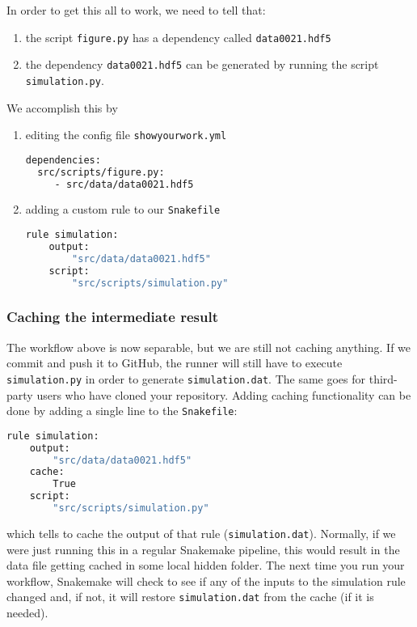 \documentclass{aa}
\begin{document}
In order to get this all to work, we need to tell \showyourwork that:
\begin{enumerate}
\item the script \texttt{figure.py} has a dependency called \texttt{data0021.hdf5}
\item the dependency \texttt{data0021.hdf5} can be generated by running the script \texttt{simulation.py}. 
\end{enumerate}

We accomplish this by

\begin{enumerate}

\item editing the config file \texttt{showyourwork.yml}

\begin{lstlisting}[language=bash]
dependencies:
  src/scripts/figure.py:
     - src/data/data0021.hdf5
\end{lstlisting}

\item adding a custom rule to our \texttt{Snakefile}

\begin{lstlisting}[language=bash]
rule simulation:
    output:
        "src/data/data0021.hdf5"
    script:
        "src/scripts/simulation.py"
\end{lstlisting}

\end{enumerate}

\subsubsection{Caching the intermediate result}

The workflow above is now separable, but we are still not caching anything.
If we commit and push it to GitHub, the runner will still have to execute \texttt{simulation.py} in order to generate \texttt{simulation.dat}.
The same goes for third-party users who have cloned your repository.
Adding caching functionality can be done by adding a single line to the \texttt{Snakefile}:

\begin{lstlisting}[language=bash]
rule simulation:
    output:
        "src/data/data0021.hdf5"
    cache:
        True
    script:
        "src/scripts/simulation.py"
\end{lstlisting}

which tells \showyourwork to cache the output of that rule (\texttt{simulation.dat}). 
Normally, if we were just running this in a regular Snakemake pipeline, this would result in the data file getting cached in some local hidden folder.
The next time you run your workflow, Snakemake will check to see if any of the inputs to the simulation rule changed and, if not, it will restore \texttt{simulation.dat} from the cache (if it is needed).
\end{document}
